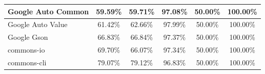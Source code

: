 \documentclass[conference,draftclsnofoot,onecolumn]{IEEEtran}
\begin{document}
\begin{table}[ht]
\begin{tabular}{|l|c|c|c|c|c|}
Google Auto Common            & 59.59\%                                                                                 & 59.71\%                                                                                     & 97.08\%                                                                              & 50.00\%                                                                               & 100.00\%                                                                             \\ \hline
Google Auto Value             & 61.42\%                                                                                 & 62.66\%                                                                                     & 97.99\%                                                                              & 50.00\%                                                                               & 100.00\%                                                                             \\ \hline
Google Gson                   & 66.83\%                                                                                 & 66.84\%                                                                                     & 97.37\%                                                                              & 50.00\%                                                                               & 100.00\%                                                                             \\ \hline
commons-io                    & 69.70\%                                                                                 & 66.07\%                                                                                     & 97.34\%                                                                              & 50.00\%                                                                               & 100.00\%                                                                             \\ \hline
commons-cli                   & 79.07\%                                                                                 & 79.12\%                                                                                     & 96.83\%                                                                              & 50.00\%                                                                               & 100.00\%                                                                             \\ \hline

\end{tabular}
\end{table}
\end{document}
